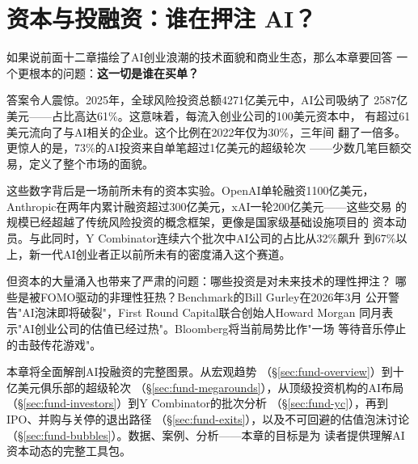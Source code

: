 
\chapter{资本与投融资：谁在押注 AI？}
\label{ch:funding}


如果说前面十二章描绘了AI创业浪潮的技术面貌和商业生态，那么本章要回答
一个更根本的问题：\textbf{这一切是谁在买单？}

答案令人震惊。2025年，全球风险投资总额4271亿美元中，AI公司吸纳了
2587亿美元——占比高达61\%。这意味着，每流入创业公司的100美元资本中，
有超过61美元流向了与AI相关的企业。这个比例在2022年仅为30\%，三年间
翻了一倍多。更惊人的是，73\%的AI投资来自单笔超过1亿美元的超级轮次
——少数几笔巨额交易，定义了整个市场的面貌。

这些数字背后是一场前所未有的资本实验。OpenAI单轮融资1100亿美元，
Anthropic在两年内累计融资超过300亿美元，xAI一轮200亿美元——这些交易
的规模已经超越了传统风险投资的概念框架，更像是国家级基础设施项目的
资本动员。与此同时，Y Combinator连续六个批次中AI公司的占比从32\%飙升
到67\%以上，新一代AI创业者正以前所未有的密度涌入这个赛道。

但资本的大量涌入也带来了严肃的问题：哪些投资是对未来技术的理性押注？
哪些是被FOMO驱动的非理性狂热？Benchmark的Bill Gurley在2026年3月
公开警告"AI泡沫即将破裂"，First Round Capital联合创始人Howard Morgan
同月表示"AI创业公司的估值已经过热"。Bloomberg将当前局势比作"一场
等待音乐停止的击鼓传花游戏"。

本章将全面解剖AI投融资的完整图景。从宏观趋势
（\S\ref{sec:fund-overview}）到十亿美元俱乐部的超级轮次
（\S\ref{sec:fund-megarounds}），从顶级投资机构的AI布局
（\S\ref{sec:fund-investors}）到Y Combinator的批次分析
（\S\ref{sec:fund-yc}），再到IPO、并购与关停的退出路径
（\S\ref{sec:fund-exits}），以及不可回避的估值泡沫讨论
（\S\ref{sec:fund-bubbles}）。数据、案例、分析——本章的目标是为
读者提供理解AI资本动态的完整工具包。

